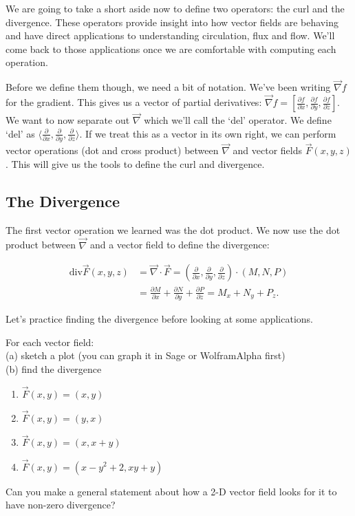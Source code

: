We are going to take a short aside now to define two operators: the curl and the divergence. These operators provide insight into how vector fields are behaving and have direct applications to understanding circulation, flux and flow. We'll come back to those applications once we are comfortable with computing each operation.

Before we define them though, we need a bit of notation. We've been writing $\vec \nabla f$ for the gradient. This gives us a vector of partial derivatives:  $\vec \nabla f= \left[ \frac{\partial f}{\partial x},\frac{\partial f}{\partial y},\frac{\partial f}{\partial z}\right]$. We want to now separate out $\vec \nabla$ which we'll call the `del' operator. We define `del' as $\langle \frac{\partial}{\partial x},\frac{\partial}{\partial y},\frac{\partial}{\partial z}\rangle$. If we treat this as a vector in its own right, we can perform vector operations (dot and cross product) between $\vec \nabla$ and vector fields $\vec{F}(x,y,z)$. This will give us the tools to define the curl and divergence.

\subsection{The Divergence}
The first vector operation we learned was the dot product. We now use the dot product between $\vec \nabla$ and a vector field to define the divergence:

\begin{align*}
\text{div}\vec F(x,y,z) 
&= \vec \nabla\cdot \vec F 
= \left(\frac{\partial }{\partial x},\frac{\partial }{\partial y},\frac{\partial }{\partial z} \right)\cdot (M,N,P) \\
&= \frac{\partial M}{\partial x}+\frac{\partial N}{\partial y}+\frac{\partial P}{\partial z} 
= M_x+N_y+P_z 
.
\end{align*}

Let's practice finding the divergence before looking at some applications.

\begin{problem}\label{2d_div}
For each vector field: \\
(a) sketch a plot (you can graph it in Sage or WolframAlpha first)\\
(b) find the divergence \\
\begin{enumerate}
\item $\vec{F}(x,y)=(x,y)$
\item $\vec{F}(x,y)=(y,x)$
\item $\vec{F}(x,y)=(x,x+y)$
\item $\vec{F}(x,y)=(x-y^2+2, xy+y)$
\end{enumerate}
Can you make a general statement about how a 2-D vector field looks for it to have non-zero divergence?
\end{problem}

